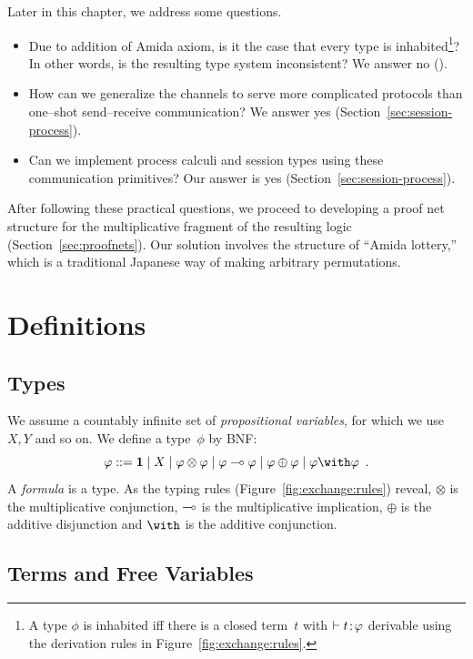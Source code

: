 Later in this chapter, we address some questions.
\begin{itemize}
 \item Due to addition of Amida axiom, is it the case that
       every type is inhabited\footnote{A type $\phi$ is inhabited iff
       there is a closed term~$t$ with $\vdash {t} \mathord{\colon\kern -2pt}{\varphi}$ derivable
       using the derivation rules in Figure~\ref{fig:exchange:rules}.}?
       In other words,
       is the resulting type system inconsistent?  We answer no ().
 \item How can we generalize the channels to serve more complicated
       protocols than one--shot send--receive communication?  We answer
       yes (Section~\ref{sec:session-process}).
 \item Can we implement process calculi and session types using these communication
       primitives?  Our answer is yes (Section~\ref{sec:session-process}).
\end{itemize}

After following these practical questions,
we proceed to developing a proof net structure for the multiplicative
fragment of the resulting logic
(Section~\ref{sec:proofnets}).
Our solution involves the structure of
``Amida lottery,'' which is a traditional
Japanese way of making arbitrary permutations.

\section{Definitions}

\subsection{Types}
We assume a countably infinite set of \textit{propositional
variables}, for which
we use $X,Y$ and so on.
We define a type~$\phi$ by BNF:
\[
 \phi::=\one \mid X \mid \phi\otimes\phi\mid \phi\limp\phi\mid
 \phi\oplus\phi\mid \phi\with\phi\enspace.
\]
A \textit{formula} is a type.
As the typing rules (Figure~\ref{fig:exchange:rules}) reveal,
$\otimes$ is the multiplicative conjunction,
$\multimap$ is the multiplicative implication,
$\oplus$ is the additive disjunction and
$\with$ is the additive conjunction.

\subsection{Terms and Free Variables}

